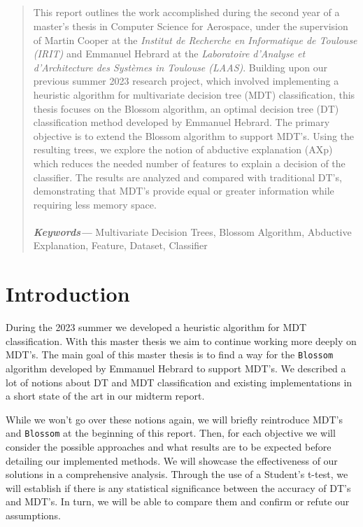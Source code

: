\documentclass[12pt]{report}
\theoremstyle{definition}
\theoremstyle{definition}
\theoremstyle{definition}
\providecommand{\keywords}[1]
{\small	\textbf{\textit{Keywords---}} #1}
\begin{document}
\begin{abstract}
\paragraph{} This report outlines the work accomplished during the second year of a master's thesis in Computer Science for Aerospace, under the supervision of Martin Cooper at the \textit{Institut de Recherche en Informatique de Toulouse (IRIT)} and Emmanuel Hebrard at the \textit{Laboratoire d'Analyse et d'Architecture des Systèmes in Toulouse (LAAS)}. Building upon our previous summer 2023 research project, which involved implementing a heuristic algorithm for multivariate decision tree (MDT) classification, this thesis focuses on the Blossom algorithm, an optimal decision tree (DT) classification method developed by Emmanuel Hebrard. The primary objective is to extend the Blossom algorithm to support MDT's. Using the resulting trees, we explore the notion of abductive explanation (AXp) which reduces the needed number of features to explain a decision of the classifier. The results are analyzed and compared with traditional DT's, demonstrating that MDT's provide equal or greater information while requiring less memory space.\\\\
\keywords{Multivariate Decision Trees, Blossom Algorithm, Abductive Explanation, Feature, Dataset, Classifier}
\end{abstract}



\tableofcontents



\chapter*{Introduction}
During the 2023 summer we developed a heuristic algorithm for MDT classification. With this master thesis we aim to continue working more deeply on MDT's. The main goal of this master thesis is to find a way for the \texttt{Blossom} algorithm developed by Emmanuel Hebrard to support MDT's. We described a lot of notions about DT and MDT classification and existing implementations in a short state of the art in our midterm report.

While we won't go over these notions again, we will briefly reintroduce MDT's and \texttt{Blossom} at the beginning of this report. Then, for each objective we will consider the possible approaches and what results are to be expected before detailing our implemented methods. We will showcase the effectiveness of our solutions in a comprehensive analysis. Through the use of a Student's t-test, we will establish if there is any statistical significance between the accuracy of DT's and MDT's. In turn, we will be able to compare them and confirm or refute our assumptions. 
\end{document}
